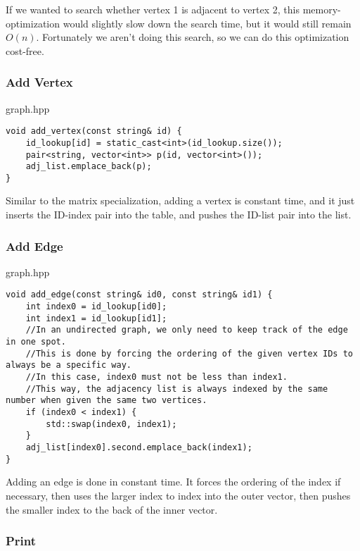 \documentclass[letterpaper, 10pt,DIV=13]{scrartcl}
\numberwithin{equation}{section} %
\numberwithin{figure}{section} %
\numberwithin{table}{section} %
\begin{document}
If we wanted to search whether vertex 1 is adjacent to vertex 2, this memory-optimization would slightly
slow down the search time, but it would still remain $O(n)$. Fortunately we aren't doing this search, so we
can do this optimization cost-free.

\subsubsection{Add Vertex}

graph.hpp
\begin{verbatim}
void add_vertex(const string& id) {
    id_lookup[id] = static_cast<int>(id_lookup.size());
    pair<string, vector<int>> p(id, vector<int>());
    adj_list.emplace_back(p);
}
\end{verbatim}

Similar to the matrix specialization, adding a vertex is constant time, and it just inserts the ID-index
pair into the table, and pushes the ID-list pair into the list.

\subsubsection{Add Edge}

graph.hpp
\begin{verbatim}
void add_edge(const string& id0, const string& id1) {
    int index0 = id_lookup[id0];
    int index1 = id_lookup[id1];
    //In an undirected graph, we only need to keep track of the edge in one spot.
    //This is done by forcing the ordering of the given vertex IDs to always be a specific way.
    //In this case, index0 must not be less than index1.
    //This way, the adjacency list is always indexed by the same number when given the same two vertices.
    if (index0 < index1) {
        std::swap(index0, index1);
    }
    adj_list[index0].second.emplace_back(index1);
}
\end{verbatim}

Adding an edge is done in constant time. It forces the ordering of the index if necessary, then uses
the larger index to index into the outer vector, then pushes the smaller index to the back of the inner
vector.

\subsubsection{Print}
\end{document}

